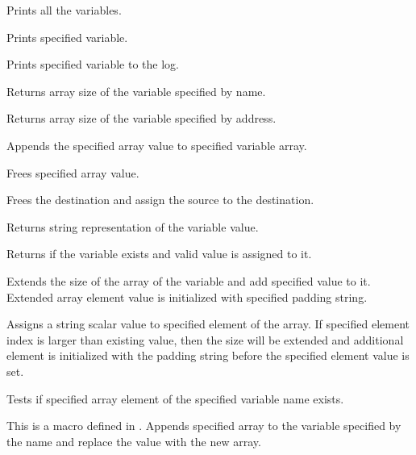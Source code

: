   
      Prints all the variables.
  
  
      Prints specified variable.
  
  
      Prints specified variable to the log.
  
  
      Returns array size of the variable specified by name.
  
  
      Returns array size of the variable specified by address.
  
  
      Appends the specified array value to specified variable array.
  
  
      Frees specified array value.
  
  
      Frees the destination and assign the source to the destination.
  
  
      Returns string representation of the variable value.
  
  
      Returns if the variable exists and valid value is assigned to it.
  
  
      Extends the size of the array of the variable and add specified value to it.
      Extended array element value is initialized with specified padding string.
  
  
      Assigns a string scalar value to specified element of the array.
      If specified element index is larger than existing value, then
      the size will be extended and additional element is initialized
      with the padding string before the specified element value is set.
  
  
      Tests if specified array element of the specified variable name exists.
  
  
      This is a macro defined in .
      Appends specified array  to the variable specified by the name  and replace
	  the value   with the new array.
  

